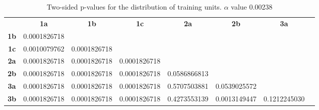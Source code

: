 \begin{table}[h!]
    \centering
    \begin{tabular}{cccccccc}
                              & \textbf{1a}  & \textbf{1b}  & \textbf{1c}  & \textbf{2a}        & \textbf{2b}        & \textbf{3a}       \\
    \textbf{1b}               & 0.0001826718 &              &              &                    &                    &                   \\
    \textbf{1c}               & 0.0010079762 & 0.0001826718 &              &                    &                    &                   \\
    \textbf{2a}               & 0.0001826718 & 0.0001826718 & 0.0001826718 &                    &                    &                   \\
    \textbf{2b}               & 0.0001826718 & 0.0001826718 & 0.0001826718 & 0.0586866813       &                    &                   \\
    \textbf{3a}               & 0.0001826718 & 0.0001826718 & 0.0001826718 & 0.5707503881       & 0.0539025572       &                   \\
    \textbf{3b}               & 0.0001826718 & 0.0001826718 & 0.0001826718 & 0.4273553139       & 0.0013149447       & 0.1212245030
    \end{tabular}
    \caption{Two-sided p-values for the distribution of training units. \(\alpha\) value 0.00238}
    \label{tab:exp2.trainingptable}
\end{table}